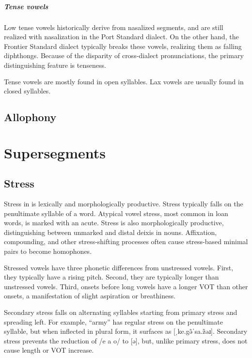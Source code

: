 \paragraph{Tense vowels}
Low tense vowels historically derive from nasalized segments, and are still realized with nasalization in the Port Standard dialect. On the other hand, the Frontier Standard dialect typically breaks these vowels, realizing them as falling diphthongs. Because of the disparity of cross-dialect pronunciations, the primary distinguishing feature is tenseness.

Tense vowels are mostly found in open syllables. Lax vowels are usually found in closed syllables.

\section{Allophony}

\setchapterpreamble[u]{\margintoc}
\chapter{Supersegments}
\section{Stress}
Stress in \langname{} is lexically and morphologically productive. Stress typically falls on the penultimate syllable of a word. Atypical vowel stress, most common in loan words, is marked with an acute.  Stress is also morphologically productive, distinguishing between unmarked and distal deixis in nouns. Affixation, compounding, and other stress-shifting processes often cause stress-based minimal pairs to become homophones.

Stressed vowels have three phonetic differences from unstressed vowels. First, they typically have a rising pitch. Second, they are typically longer than unstressed vowels. Third, onsets before long vowels have a longer VOT than other onsets, a manifestation of slight aspiration or breathiness.

Secondary stress falls on alternating syllables starting from primary stress and spreading left. For example,  “army” has regular stress on the penultimate syllable, but when inflected in plural form, it surfaces as  [ˌke.gə̃ˈsa.z̃əɹ]. Secondary stress prevents the reduction of /e a o/ to [ə], but, unlike primary stress, does not cause length or VOT increase.

